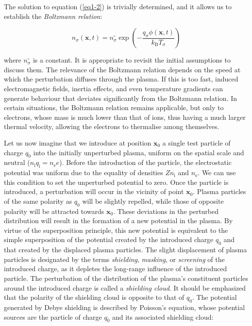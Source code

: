The solution to equation (\ref{eq1-2}) is trivially determined, and it allows us to establish the \textit{Boltzmann relation}:

\begin{equation}
    \label{eq1-3}
    n_\sigma(\mathbf{x},t)=n_\sigma^\square\exp\left(-\frac{q_\sigma\phi(\mathbf{x},t)}{k_\mathrm{B}T_\sigma}\right)
\end{equation}

where $n_\sigma^\square$ is a constant. It is appropriate to revisit the initial assumptions to discuss them. The relevance of the Boltzmann relation depends on the speed at which the perturbation diffuses through the plasma. If this is too fast, induced electromagnetic fields, inertia effects, and even temperature gradients can generate behaviour that deviates significantly from the Boltzmann relation. In certain situations, the Boltzmann relation remains applicable, but only to electrons, whose mass is much lower than that of ions, thus having a much larger thermal velocity, allowing the electrons to thermalise among themselves.

\vspace*{2.5pt}

\quad Let us now imagine that we introduce at position $\mathbf{x}_0$ a single test particle of charge $q_0$ into the initially unperturbed plasma, uniform on the spatial scale and neutral ($n_{\mathrm{i}}q_{\mathrm{i}}=n_{\mathrm{e}}e$). Before the introduction of the particle, the electrostatic potential was uniform due to the equality of densities $Zn_{\mathrm{i}}$ and $n_{\mathrm{e}}$. We can use this condition to set the unperturbed potential to zero. Once the particle is introduced, a perturbation will occur in the vicinity of point $\mathbf{x}_0$. Plasma particles of the same polarity as $q_0$ will be slightly repelled, while those of opposite polarity will be attracted towards $\mathbf{x}_0$. These deviations in the perturbed distribution will result in the formation of a new potential in the plasma. By virtue of the superposition principle, this new potential is equivalent to the simple superposition of the potential created by the introduced charge $q_0$ and that created by the displaced plasma particles. The slight displacement of plasma particles is designated by the terms \textit{shielding}, \textit{masking}, or \textit{screening} of the introduced charge, as it depletes the long-range influence of the introduced particle. The perturbation of the distribution of the plasma's constituent particles around the introduced charge is called a \textit{shielding cloud}. It should be emphasized that the polarity of the shielding cloud is opposite to that of $q_0$. The potential generated by Debye shielding is described by Poisson's equation, whose potential sources are the particle of charge $q_0$ and its associated shielding cloud:

